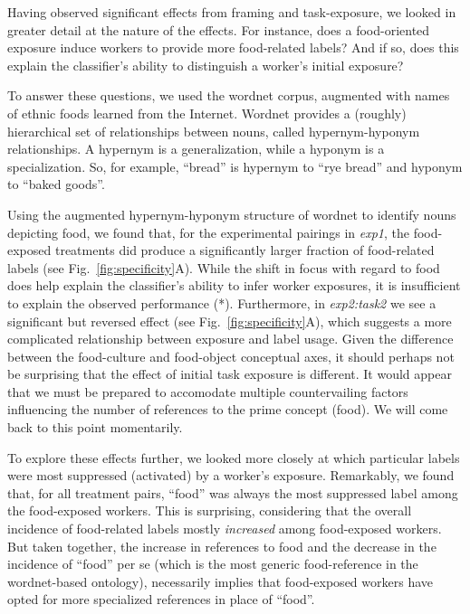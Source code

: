 \documentclass[12pt]{article}
\begin{document}
Having observed significant effects from framing and task-exposure,
we looked in greater detail at the nature of the effects.  For instance,
does a food-oriented exposure induce workers to provide more food-related
labels?  And if so, does this explain the classifier's ability to distinguish
a worker's initial exposure? 

To answer these questions, we used the wordnet corpus, augmented with names of
ethnic foods learned from the Internet.  Wordnet provides a (roughly)
hierarchical set of relationships between nouns, called hypernym-hyponym
relationships.  A hypernym is a generalization, while a hyponym is a 
specialization.  So, for example, ``bread'' is hypernym to ``rye bread'' 
and hyponym to ``baked goods''.

Using the augmented hypernym-hyponym structure of wordnet to identify nouns 
depicting food, we found that, for the experimental pairings in 
\textit{exp1}, the
food-exposed treatments did produce a significantly larger fraction of 
food-related labels (see Fig.~\ref{fig:specificity}A).  While the shift in 
focus with regard to food does help explain the classifier's ability to 
infer worker exposures, it is insufficient to explain the observed performance
(*).
Furthermore, in \textit{exp2:task2} we see a significant but reversed effect
(see Fig.~\ref{fig:specificity}A), which suggests a more complicated 
relationship between exposure and label usage.
Given the difference between the food-culture and food-object conceptual axes, 
it should perhaps not be surprising that the effect of initial task exposure 
is different.  It would appear that we must be prepared to accomodate multiple 
countervailing factors influencing the number of references to the prime 
concept (food).  We will come back to this point momentarily.

To explore these effects further, we looked more closely at which particular
labels were most suppressed (activated) by a worker's exposure.  Remarkably,
we found that, for all treatment pairs, ``food'' was always the most 
suppressed label among 
the food-exposed workers.  This is surprising, considering 
that the overall incidence of food-related labels mostly \textit{increased} 
among food-exposed workers.  But taken together, the increase in references to 
food 
and the decrease in the incidence of ``food'' per se (which is the most generic
food-reference in the wordnet-based ontology), necessarily implies that
food-exposed workers have opted for more specialized references in place of 
``food''. 
\end{document}
